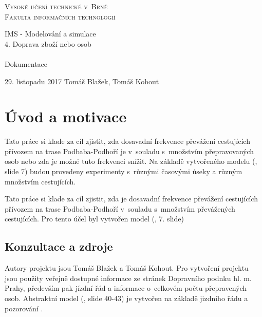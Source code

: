 \documentclass[11pt,a4paper]{article}
\author{Tomáš Kohout, Tomáš Blažek}
\begin{document}

\newcommand{\slideRef}[1]{\textit{(IMS slide #1)}}
\newcommand{\code}[1]{\texttt{#1}}

	\begin{titlepage}

		\begin{center}

			\textsc{
				\Huge
					Vysoké učení technické v~Brně\\
				\huge
					Fakulta informačních technologií
			}\\


			\LARGE
					IMS - Modelování a simulace\\
					4. Doprava zboží nebo osob\\~\\
			\Huge{}
					Dokumentace

		\end{center}

		{\Large
			29. listopadu 2017
			\hfill
			Tomáš Blažek, Tomáš Kohout
		}

	\end{titlepage}

	\tableofcontents

	\pagebreak


	\section{Úvod a motivace}
	Tato práce si klade za cíl zjistit, zda dosavadní frekvence převážení cestujících přívozem na trase Podbaba-Podhoří je
v~souladu s~množstvím přepravovaných osob nebo zda je možné tuto frekvenci snížit. Na základě vytvořeného modelu  (\cite{SLAJD}, slide 7)
  budou provedeny experimenty s~různými časovými úseky a různým množstvím cestujících.

  Tato práce si klade za cíl zjistit, zda je dosavadní frekvence převážení cestujících přívozem na trase Podbaba-Podhoří
  v~souladu s~množstvím převážených cestujících. Pro tento účel byl vytvořen model (\cite{SLAJD}, 7. slide)

	\subsection{Konzultace a zdroje}
	Autory projektu jsou Tomáš Blažek a Tomáš Kohout. Pro vytvoření projektu jsou použity veřejně dostupné informace ze stránek Dopravního podnku hl. m. Prahy, především pak jízdní řád a informace o~celkovém počtu přepravených osob. Abstraktní model (\cite{SLAJD}, slide 40-43) je vytvořen na základě jizdního řádu a pozorování .
\end{document}
